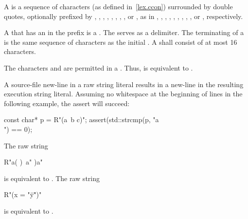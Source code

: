 \pnum
{}%
%
%
%
%
%
A  is a sequence of characters (as defined
in~\ref{lex.ccon}) surrounded by double quotes, optionally prefixed by
,
,
,
,
,
,
,
,
or ,
as in
,
,
,
,
,
,
,
,
,
or ,
respectively.

\pnum
{}%
A  that has an 
%
in the prefix is a . The
 serves as a delimiter. The terminating
 of a  is the same sequence of
characters as the initial . A 
shall consist of at most 16 characters.

\pnum
\begin{note} The characters  and  are permitted in a
. Thus,  is equivalent to
. \end{note}

\pnum
\begin{note} A source-file new-line in a raw string literal results in a new-line in the
resulting execution string literal. Assuming no
whitespace at the beginning of lines in the following example, the assert will succeed:

\begin{codeblock}
const char* p = R"(a\
b
c)";
assert(std::strcmp(p, "a\\\nb\nc") == 0);
\end{codeblock}
\end{note}

\pnum
\begin{example} The raw string

\begin{codeblock}
R"a(
)\
a"
)a"
\end{codeblock}

is equivalent to . The raw string

\begin{codeblock}
R"(x = "\"y\"")"
\end{codeblock}

is equivalent to .
\end{example}

